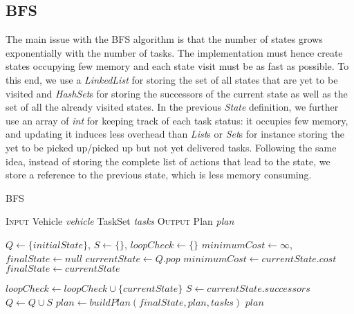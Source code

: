 \documentclass[10pt]{article}
\begin{document}
\subsection{BFS}
The main issue with the BFS algorithm is that the number of states grows exponentially with the number of tasks.
The implementation must hence create states occupying few memory and each state visit must be as fast as possible.
To this end, we use a \textit{LinkedList} for storing the set of all states that are yet to be visited and \textit{HashSet}s for storing the successors of the current state as well as the set of all the already visited states.
In the previous \textit{State} definition, we further use an array of \textit{int} for keeping track of each task status: it occupies few memory, and updating it induces less overhead than \textit{List}s or \textit{Set}s for instance storing the yet to be picked up/picked up but not yet delivered tasks.
Following the same idea, instead of storing the complete list of actions that lead to the state, we store a reference to the previous state, which is less memory consuming.

\begin{algorithm}[t]
\caption{BFS}
\begin{algorithmic}[1]
\Statex \textsc{Input}
\Statex \hspace{\algorithmicindent} Vehicle \textit{vehicle} 
\Statex \hspace{\algorithmicindent} TaskSet \textit{tasks} 
\Statex \textsc{Output}
\Statex \hspace{\algorithmicindent} Plan \textit{plan} 

\Statex	  
\State $Q \gets \{initialState\}$, $S \gets \{\}$, $loopCheck \gets \{\}$
\State $minimumCost \gets \infty$, $finalState \gets null$ 
	\State $currentState \gets Q.pop$
			\State $minimumCost \gets currentState.cost$
			\State $finalState \gets currentState$
		\EndIf
	\EndIf
	
		\State $loopCheck \gets loopCheck \cup \{currentState\}$
		\State $S \gets currentState.successors$
		\State $Q \gets Q \cup S$
	\EndIf
\EndWhile
\Statex $plan \gets buildPlan(finalState, plan, tasks)$
\State \Return $plan$
\end{algorithmic}
\end{algorithm}
\end{document}
